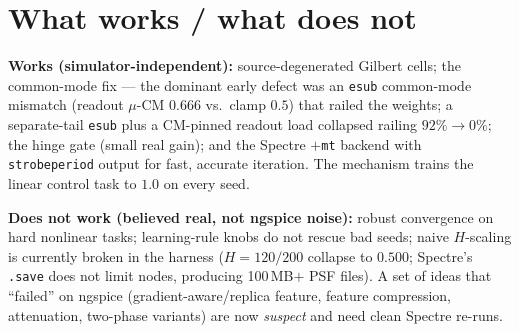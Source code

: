 \documentclass[11pt]{article}
\begin{document}
\section{What works / what does not}
\textbf{Works (simulator-independent):} source-degenerated Gilbert cells; the
common-mode fix --- the dominant early defect was an \texttt{esub} common-mode mismatch
(readout $\mu$-CM $0.666$ vs.\ clamp $0.5$) that railed the weights; a separate-tail
\texttt{esub} plus a CM-pinned readout load collapsed railing $92\%\!\to\!0\%$; the
hinge gate (small real gain); and the Spectre $+$\texttt{mt} backend with
\texttt{strobeperiod} output for fast, accurate iteration. The mechanism trains the
linear control task to $1.0$ on every seed.

\noindent\textbf{Does not work (believed real, not ngspice noise):} robust convergence
on hard nonlinear tasks; learning-rule knobs do not rescue bad seeds; naive $H$-scaling
is currently broken in the harness ($H{=}120/200$ collapse to $0.500$; Spectre's
\texttt{.save} does not limit nodes, producing 100\,MB$+$ PSF files). A set of ideas
that ``failed'' on ngspice (gradient-aware/replica feature, feature compression,
attenuation, two-phase variants) are now \emph{suspect} and need clean Spectre re-runs.
\end{document}
